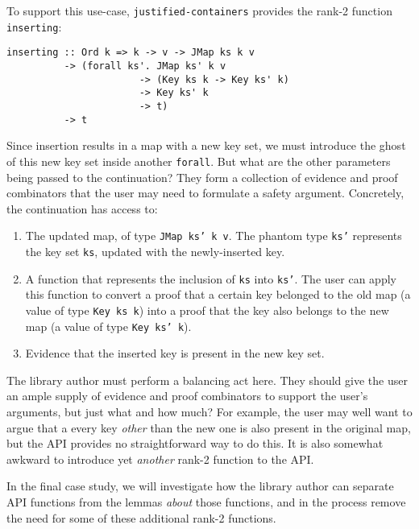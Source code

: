 \documentclass[format=sigplan, review=false, screen=true, 10pt]{acmart}
\makeatletter
\let\origsection\section
\renewcommand\section{\@ifstar{\starsection}{\nostarsection}}
\newcommand\nostarsection[1]
{\sectionprelude\origsection{#1}\sectionpostlude}
\newcommand\starsection[1]
{\sectionprelude\origsection*{#1}\sectionpostlude}
\newcommand\sectionprelude{%
  \vspace{-0.5em}
}
\newcommand\sectionpostlude{%
  \vspace{0em}
}
\makeatother
\begin{document}
To support this use-case, \texttt{justified-containers} provides the rank-2
function \texttt{inserting}:
\begin{verbatim}
inserting :: Ord k => k -> v -> JMap ks k v
          -> (forall ks'. JMap ks' k v
                       -> (Key ks k -> Key ks' k)
                       -> Key ks' k
                       -> t)
          -> t
\end{verbatim}
Since insertion results in a map with a new key set, we must
introduce the ghost of this new key set inside another \texttt{forall}.
But what are the other parameters being passed to the continuation?
They form a collection of evidence and proof combinators that the user may
need to formulate a safety argument. Concretely,  the continuation has access to:
\begin{enumerate}
\item The updated map, of type \texttt{JMap ks' k v}. The phantom type \texttt{ks'}
  represents the key set \texttt{ks}, updated with the newly-inserted key.
\item A function that represents the inclusion of \texttt{ks} into \texttt{ks'}.
  The user can apply this function to convert a proof that a certain key belonged to the
  old map (a value of type \texttt{Key ks k}) into a proof that the key also belongs to the new map (a value of type \texttt{Key ks' k}).
\item Evidence that the inserted key is present in the new key set.
\end{enumerate}

The library author must perform a balancing act here. They should give 
the user an ample supply of evidence and proof combinators to support the user's
arguments, but just what and how much? For example, the user may well want to argue that a
every key \emph{other} than the new one is also present in the original map,
 but the API provides no straightforward way to do this.
It is also somewhat awkward to introduce yet \emph{another}
rank-2 function to the API.

In the final case study, we will investigate how
the library author can separate API functions from the lemmas \emph{about} those
functions, and in the process remove the need for some of these additional
rank-2 functions.

\section{Case Study \#4: Arbitrary invariants}\label{full-gdp}
\end{document}

